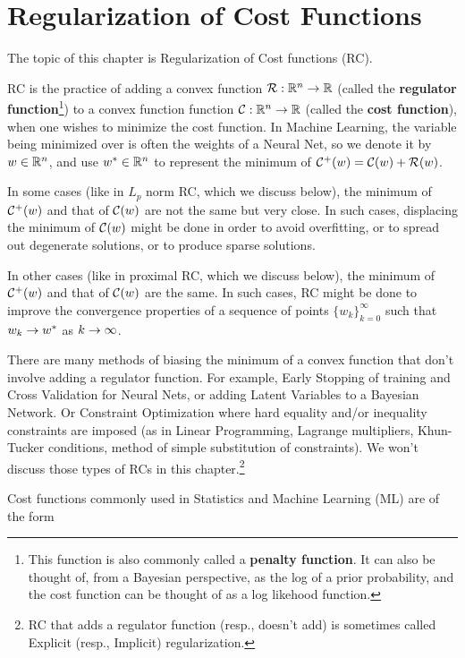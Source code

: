 \chapter{Regularization of Cost Functions}
\label{ch-regularization}


 The topic
 of this chapter is Regularization of Cost functions (RC).

RC is the practice of adding 
a convex function  ${\cal R}:{ \mathbb{R}}^n\rightarrow { \mathbb{R}}$
(called the {\bf regulator function}\footnote{This function is also commonly called a {\bf penalty function}.
It can  also be thought  of, from a Bayesian perspective,
as the log of a prior probability, and the cost function can be thought of as a log likehood function.}) to
a convex function  function ${\cal C}:{ \mathbb{R}}^n\rightarrow { \mathbb{R}}$
(called the {\bf  cost function}), when one
wishes to minimize the cost function. In Machine Learning,
the variable being minimized over is often the weights 
of a Neural Net, so we denote it by $w\in { \mathbb{R}}^n$, and use $w^*\in { \mathbb{R}}^n$
to represent the
minimum of ${\cal C}^+(w) ={\cal C}(w)+ {\cal R}(w)$. 

In some cases (like in $L_p$ norm RC,
which we discuss below),
the minimum of ${\cal C}^+(w)$
and that of ${\cal C}(w)$
are not the same but very close. In such cases,
displacing the minimum of 
${\cal C}(w)$ 
might be done in order
to avoid overfitting, or
to spread out degenerate solutions, or to produce
sparse solutions. 

In other cases (like in proximal RC, which we discuss below),
the minimum of ${\cal C}^+(w)$
and that of ${\cal C}(w)$
are the  same. 
In such cases, RC might be done
to improve the
convergence properties
of a sequence of points
$\{w_k\}_{k=0}^\infty$
such that $w_k\rightarrow w^*$
as $k
\rightarrow \infty$.

There are many methods
of biasing the 
minimum of a convex function that  don't
involve adding a regulator
function.
For example, Early Stopping
of training 
and Cross Validation for Neural Nets,
or adding Latent Variables
to a Bayesian Network.
Or Constraint Optimization where hard equality and/or inequality constraints are imposed (as in Linear Programming,
Lagrange multipliers, Khun-Tucker conditions, method of simple substitution of constraints).
We won't discuss those types of
RCs in this chapter.\footnote{RC that adds a regulator function (resp., doesn't add)
is sometimes called Explicit (resp., Implicit)
regularization.}



Cost functions commonly used in Statistics and
Machine Learning (ML) are of the form


